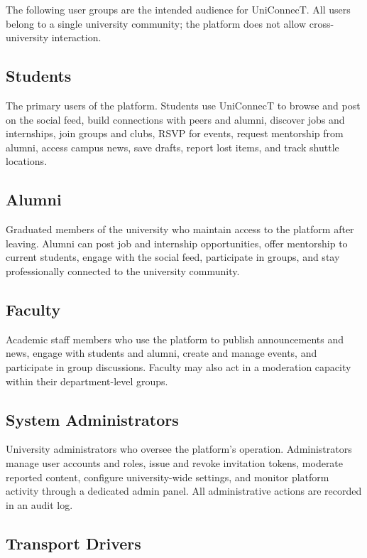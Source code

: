 \documentclass[12pt, a4paper]{article}
\begin{document}
The following user groups are the intended audience for UniConnecT. All users belong to
a single university community; the platform does not allow cross-university interaction.

\subsection{Students}

The primary users of the platform. Students use UniConnecT to browse and post on the
social feed, build connections with peers and alumni, discover jobs and internships,
join groups and clubs, RSVP for events, request mentorship from alumni, access campus
news, save drafts, report lost items, and track shuttle locations.

\subsection{Alumni}

Graduated members of the university who maintain access to the platform after leaving.
Alumni can post job and internship opportunities, offer mentorship to current students,
engage with the social feed, participate in groups, and stay professionally connected
to the university community.

\subsection{Faculty}

Academic staff members who use the platform to publish announcements and news, engage
with students and alumni, create and manage events, and participate in group
discussions. Faculty may also act in a moderation capacity within their
department-level groups.

\subsection{System Administrators}

University administrators who oversee the platform's operation. Administrators manage
user accounts and roles, issue and revoke invitation tokens, moderate reported content,
configure university-wide settings, and monitor platform activity through a dedicated
admin panel. All administrative actions are recorded in an audit log.

\subsection{Transport Drivers}
\end{document}

